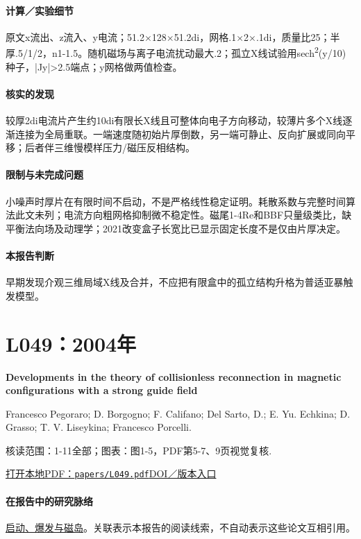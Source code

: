 \paragraph{计算／实验细节}原文x流出、z流入、y电流；51.2×128×51.2di，网格.1×2×.1di，质量比25；半厚.5/1/2，n1-1.5。随机磁场与离子电流扰动最大.2；孤立X线试验用sech\textsuperscript{2}(y/10)种子，|Jy|>2.5端点；y网格做两值检查。

\paragraph{核实的发现}较厚2di电流片产生约10di有限长X线且可整体向电子方向移动，较薄片多个X线逐渐连接为全局重联。一端速度随初始片厚倒数，另一端可静止、反向扩展或同向平移；后者伴三维慢模样压力/磁压反相结构。

\paragraph{限制与未完成问题}小噪声时厚片在有限时间不启动，不是严格线性稳定证明。耗散系数与完整时间算法此文未列；电流方向粗网格抑制微不稳定性。磁尾1-4Re和BBF只量级类比，缺平衡法向场及动理学；2021改变盒子长宽比已显示固定长度不是仅由片厚决定。

\paragraph{本报告判断}早期发现介观三维局域X线及合并，不应把有限盒中的孤立结构升格为普适亚暴触发模型。

\section{L049：2004年}\label{paper:L049}

\textbf{Developments in the theory of collisionless reconnection in magnetic configurations with a strong guide field}\citep{L049}\

Francesco Pegoraro;  D. Borgogno;  F. Califano;  Del Sarto,  D.;  E. Yu. Echkina;  D. Grasso;  T. V. Liseykina;  Francesco Porcelli.

\textsf{核读范围：}1-11全部；\textsf{图表：}图1-5，PDF第5-7、9页视觉复核.

\href{run:papers/L049.pdf}{打开本地PDF：\texttt{papers/L049.pdf}}\quad\href{https://doi.org/10.5194/npg-11-567-2004}{DOI／版本入口}

\paragraph{在报告中的研究脉络}\hyperref[story:onset]{启动、爆发与磁岛}。关联表示本报告的阅读线索，不自动表示这些论文互相引用。

